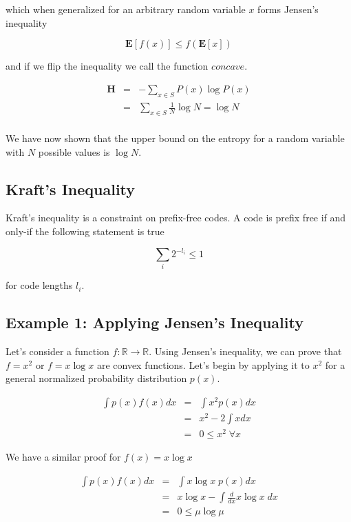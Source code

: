 \documentclass[a4paper,11pt]{book}
\begin{document}
which when generalized for an arbitrary random variable $x$ forms Jensen's inequality

\begin{equation}
\mathbf{E}[f(x)] \leq f(\mathbf{E}[x])
\end{equation}

and if we flip the inequality we call the function $\textit{concave}$.

\begin{eqnarray*}
\textbf{H} &=& -\sum_{x\in S} P(x)\log P(x) \\
&=& \sum_{x\in S} \frac{1}{N}\log N  = \log N\\
\end{eqnarray*}

We have now shown that the upper bound on the entropy for a random variable with $N$ possible values is $\log N$.

\subsection{Kraft's Inequality}

Kraft's inequality is a constraint on prefix-free codes. A code is prefix free if and only-if the following statement is true

\begin{equation}
\sum_{i} 2^{-l_{i}} \leq 1
\end{equation}

for code lengths $l_{i}$.


\subsection{Example 1: Applying Jensen's Inequality}

Let's consider a function $f: \mathbb{R} \rightarrow \mathbb{R}$. Using Jensen's inequality, we can prove that $f=x^{2}$ or $f=x\log x$ are convex functions. Let's begin by applying it to $x^{2}$ for a general normalized probability distribution $p(x)$.

\begin{eqnarray*}
\int p(x)f(x)dx & = & \int x^{2}p(x)dx\\
&=& x^{2} - 2\int xdx\\
&=& 0 \leq x^{2} \; \forall x
\end{eqnarray*}

We have a similar proof for $f(x) = x\log x$

\begin{eqnarray*}
\int p(x)f(x)dx & = & \int x\log x\; p(x)dx\\
&=& x\log x - \int \frac{d}{dx}x\log x\;dx\\
&=& 0 \leq \mu \log \mu
\end{eqnarray*}
\end{document}
